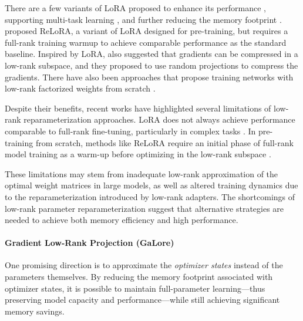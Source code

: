 There are a few variants of LoRA proposed to enhance its performance \citep{renduchintalaTiedLoraEnhacingParameter2023, shengSLoRAServingThousands2023, zhangLORAFAMEMORYEFFICIENTLOWRANK, xiaChainLoRAEfficient2024}, supporting multi-task learning \citep{wangMultiLoRADemocratizingLoRA2023}, and further reducing the memory footprint \citep{dettmersQLoRAEfficientFinetuning2023}.
\citet{lialinReLoRAHighRankTraining2023} proposed ReLoRA, a variant of LoRA designed for pre-training, but requires a full-rank training warmup to achieve comparable performance as the standard baseline. Inspired by LoRA, \citet{haoFloraLowRankAdapters2024} also suggested that gradients can be compressed in a low-rank subspace, and they proposed to use random projections to compress the gradients. There have also been approaches that propose training networks with low-rank factorized weights from scratch \citep{kamalakaraExploringLowRank2022,wangCuttlefishLowrankModel2023,zhaoInRankIncrementalLowRank2023}.

Despite their benefits, recent works have highlighted several limitations of low-rank reparameterization approaches. LoRA does not always achieve performance comparable to full-rank fine-tuning, particularly in complex tasks \citep{xiaChainLoRAEfficient2024}. In pre-training from scratch, methods like ReLoRA require an initial phase of full-rank model training as a warm-up before optimizing in the low-rank subspace \citep{lialinReLoRAHighRankTraining2023}.

These limitations may stem from inadequate low-rank approximation of the optimal weight matrices in large models, as well as altered training dynamics due to the reparameterization introduced by low-rank adapters. The shortcomings of low-rank parameter reparameterization suggest that alternative strategies are needed to achieve both memory efficiency and high performance.

\paragraph{Gradient Low-Rank Projection (GaLore)}

One promising direction is to approximate the \emph{optimizer states} instead of the parameters themselves. By reducing the memory footprint associated with optimizer states, it is possible to maintain full-parameter learning—thus preserving model capacity and performance—while still achieving significant memory savings.

